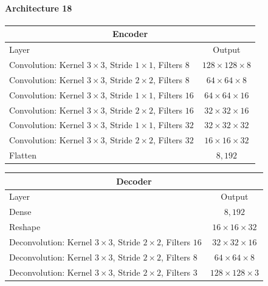 \paragraph{Architecture 18}

\begin{center}
    \begin{table}[H]
        \centering
        \begin{tabular}{ | l | c | }
            \multicolumn{2}{c}{Encoder} \\ \hline
            Layer & Output\\ \hline
            Convolution: Kernel $3\times3$, Stride $1\times1$, Filters $8  $    & $128\times 128\times 8  $    \\
            Convolution: Kernel $3\times3$, Stride $2\times2$, Filters $8  $    & $64\times 64\times   8  $    \\
            Convolution: Kernel $3\times3$, Stride $1\times1$, Filters $16 $    & $64\times 64\times   16 $    \\
            Convolution: Kernel $3\times3$, Stride $2\times2$, Filters $16 $    & $32\times 32\times   16 $    \\
            Convolution: Kernel $3\times3$, Stride $1\times1$, Filters $32 $    & $32\times 32\times   32 $    \\
            Convolution: Kernel $3\times3$, Stride $2\times2$, Filters $32 $    & $16\times 16\times   32 $    \\
            Flatten                                                             & $8,192$                      \\
            \hline
        \end{tabular} 
    \end{table}
\end{center}
\vspace{-4em}
\begin{center}
    \begin{table}[H]
        \centering
        \begin{tabular}{ | l | c | }
            \multicolumn{2}{c}{Decoder} \\ \hline
            Layer & Output\\ \hline
            Dense                                                                   & $8,192$                   \\
            Reshape                                                                 & $16\times 16\times  32 $  \\
            Deconvolution: Kernel $3\times3$, Stride $2\times2$, Filters $16 $      & $32\times 32\times  16 $  \\
            Deconvolution: Kernel $3\times3$, Stride $2\times2$, Filters $8  $      & $64\times 64\times  8  $  \\
            Deconvolution: Kernel $3\times3$, Stride $2\times2$, Filters $3  $      & $128\times 128\times3  $  \\
            \hline
        \end{tabular} 
    \end{table}
\end{center}

